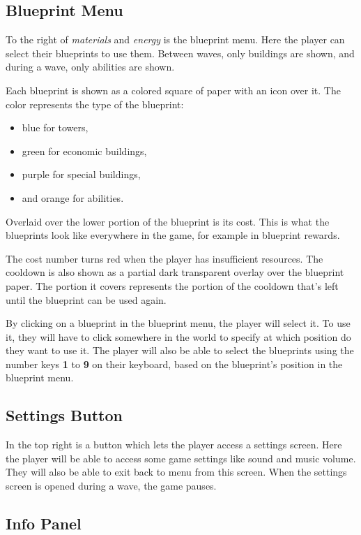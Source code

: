 \subsection{Blueprint Menu}\label{sec:design-blueprint-menu}

To the right of \emph{materials} and \emph{energy} is the blueprint menu.
Here the player can select their blueprints to use them.
Between waves, only buildings are shown, and during a wave, only abilities are shown.

Each blueprint is shown as a colored square of paper with an icon over it.
The color represents the type of the blueprint:
\begin{itemize}
    \item blue for towers,
    \item green for economic buildings,
    \item purple for special buildings,
    \item and orange for abilities.
\end{itemize}
Overlaid over the lower portion of the blueprint is its cost.
This is what the blueprints look like everywhere in the game, for example in blueprint rewards.

The cost number turns red when the player has insufficient resources.
The cooldown is also shown as a partial dark transparent overlay over the blueprint paper.
The portion it covers represents the portion of the cooldown that's left until the blueprint can be used again.

By clicking on a blueprint in the blueprint menu, the player will select it.
To use it, they will have to click somewhere in the world to specify at which position do they want to use it.
The player will also be able to select the blueprints using the number keys \textbf{1} to \textbf{9} on their keyboard, based on the blueprint's position in the blueprint menu.

\subsection{Settings Button}

In the top right is a button which lets the player access a settings screen.
Here the player will be able to access some game settings like sound and music volume.
They will also be able to exit back to menu from this screen.
When the settings screen is opened during a wave, the game pauses.

\subsection{Info Panel}\label{sec:design-info-panel}

